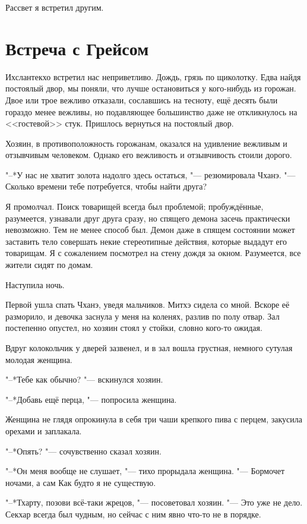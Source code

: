 \documentclass[a4paper,10pt]{book}
\newcommand{\ldotst}{\so{...}\xspace}
\begin{document}
Рассвет я встретил другим.

\section{Встреча с Грейсом}

Ихслантекхо встретил нас неприветливо. Дождь, грязь по щиколотку. Едва найдя 
постоялый двор, мы поняли, что лучше остановиться у кого-нибудь из горожан. 
Двое 
или трое вежливо отказали, сославшись на тесноту, ещё десять были гораздо менее 
вежливы, но подавляющее большинство даже не откликнулось на <<гостевой>> стук. 
Пришлось вернуться на постоялый двор.

Хозяин, в противоположность горожанам, оказался на удивление вежливым и 
отзывчивым человеком. Однако его вежливость и отзывчивость стоили дорого.

"--*У нас не хватит золота надолго здесь остаться, "--- резюмировала Чханэ. 
"--- 
Сколько времени тебе потребуется, чтобы найти друга?

Я промолчал. Поиск товарищей всегда был проблемой; пробуждённые, разумеется, 
узнавали друг друга сразу, но спящего демона засечь практически невозможно. Тем 
не менее способ был. Демон даже в спящем состоянии может заставить тело 
совершать некие стереотипные действия, которые выдадут его товарищам. Я с 
сожалением посмотрел на стену дождя за окном. Разумеется, все жители сидят по 
домам.

Наступила ночь.

Первой ушла спать Чханэ, уведя мальчиков. Митхэ сидела со мной. Вскоре её 
разморило, и девочка заснула у меня на коленях, разлив по полу отвар. Зал 
постепенно опустел, но хозяин стоял у стойки, словно кого-то ожидая.

Вдруг колокольчик у дверей зазвенел, и в зал вошла грустная, немного сутулая 
молодая женщина.

"--*Тебе как обычно? "--- вскинулся хозяин.

"--*Добавь ещё перца, "--- попросила женщина.

Женщина не глядя опрокинула в себя три чаши крепкого пива с перцем, закусила 
орехами и заплакала.

"--*Опять? "--- сочувственно сказал хозяин.

"--*Он меня вообще не слушает, "--- тихо прорыдала женщина. "--- Бормочет 
ночами, а сам\ldotst Как будто я не 
существую.

"--*Тхарту, позови всё-таки жрецов, "--- посоветовал хозяин. "--- Это уже не 
дело. Секхар всегда был чудным,
но сейчас с ним явно что-то не в порядке.
\end{document}

